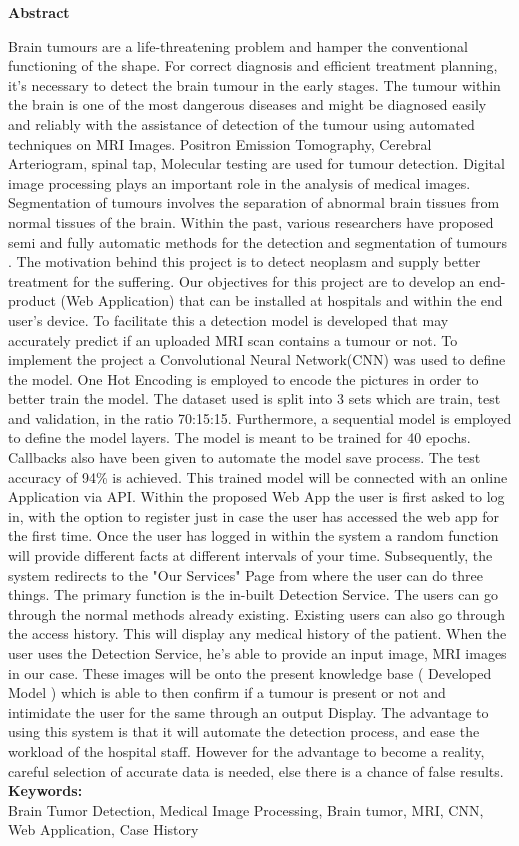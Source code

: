 \begin{center}
{\huge \bf Abstract}
\end{center}
\vspace{20mm}

Brain tumours are a life-threatening problem and hamper the conventional functioning of the shape. For correct diagnosis and efficient treatment planning, it's necessary to detect the brain tumour in the early stages. The tumour within the brain is one of the most dangerous diseases and might be diagnosed easily and reliably with the assistance of detection of the tumour using automated techniques on MRI Images. Positron Emission Tomography, Cerebral Arteriogram, spinal tap, Molecular testing are used for tumour detection. Digital image processing plays an important role in the analysis of medical images. Segmentation of tumours involves the separation of abnormal brain tissues from normal tissues of the brain. Within the past, various researchers have proposed semi and fully automatic methods for the detection and segmentation of tumours . The motivation behind this project is to detect neoplasm and supply better treatment for the suffering. Our objectives for this project are to develop an end-product (Web Application) that can be installed at hospitals and within the end user's device. To facilitate this a detection model is developed that may accurately predict if an uploaded MRI scan contains a tumour or not. To implement the project a Convolutional Neural Network(CNN) was used to define the model. One Hot Encoding is employed to encode the pictures in order to better train the model. The dataset used is split into 3 sets which are train, test and validation, in the ratio 70:15:15. Furthermore, a sequential model is employed to define the model layers. The model is meant to be trained for 40 epochs. Callbacks also have been given to automate the model save process. The test accuracy of 94\% is achieved. This trained model will be connected with an online Application via API. Within the proposed Web App the user is first asked to log in, with the option to register just in case the user has accessed the web app for the first time. Once the user has logged in within the system a random function will provide different facts at different intervals of your time. Subsequently, the system redirects to the "Our Services" Page from where the user can do three things. The primary function is the in-built Detection Service. The users can go through the normal methods already existing. Existing users can also go through the access history. This will display any medical history of the patient. When the user uses the Detection Service, he's able to provide an input image, MRI images in our case. These images will be onto the present knowledge base ( Developed Model ) which is able to then confirm if a tumour is present or not and intimidate the user for the same through an output Display. The advantage to using this system is that it will automate the detection process, and ease the workload of the hospital staff. However for the advantage to become a reality, careful selection of accurate data is needed, else there is a chance of false results.\\ 

{\bf{Keywords:}}\\ Brain Tumor Detection, Medical Image Processing, Brain tumor, MRI, CNN, Web Application, Case History 